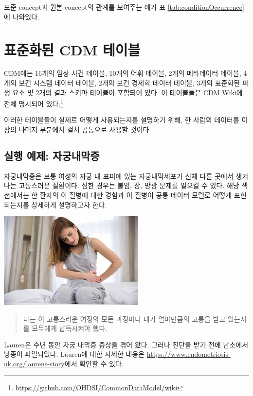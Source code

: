 \documentclass[11pt]{book}
\let\rmarkdownfootnote\footnote%
\def\footnote{\protect\rmarkdownfootnote}
\theoremstyle{definition}
\theoremstyle{definition}
\theoremstyle{definition}
\theoremstyle{remark}
\begin{document}
표준 concept과 원본 concept의 관계를 보여주는 예가 표
\ref{tab:conditionOccurrence}에 나와있다.

\section{표준화된 CDM 테이블}\label{-cdm-}


CDM에는 16개의 임상 사건 테이블, 10개의 어휘 테이블, 2개의 메타데이터
테이블, 4개의 보건 시스템 데이터 테이블, 2개의 보건 경제학 데이터
테이블, 3개의 표준화된 파생 요소 및 2개의 결과 스키마 테이블이 포함되어
있다. 이 테이블들은 CDM Wiki에 전체 명시되어 있다.\footnote{\url{https://github.com/OHDSI/CommonDataModel/wiki}}

이러한 테이블들이 실제로 어떻게 사용되는지를 설명하기 위해, 한 사람의
데이터를 이 장의 나머지 부분에서 걸쳐 공통으로 사용할 것이다.

\subsection{실행 예제: 자궁내막증}\label{--}

자궁내막증은 보통 여성의 자궁 내 표피에 있는 자궁내막세포가 신체 다른
곳에서 생겨나는 고통스러운 질환이다. 심한 경우는 불임, 장, 방광 문제를
일으킬 수 있다. 해당 섹션에서는 한 환자의 이 질병에 대한 경험과 이
질병이 공통 데이터 모델로 어떻게 표현되는지를 상세하게 설명하고자 한다.

\begin{center}\includegraphics[width=0.5\linewidth]{images/CommonDataModel/Lauren} \end{center}

\begin{quote}
나는 이 고통스러운 여정의 모든 과정마다 내가 얼마만큼의 고통을 받고
있는지를 모두에게 납득시켜야 했다.
\end{quote}

Lauren은 수년 동안 자궁 내막증 증상을 겪어 왔다. 그러나 진단을 받기 전에
난소에서 낭종이 파열되었다. Lauren에 대한 자세한 내용은
\url{https://www.endometriosis-uk.org/laurens-story}에서 확인할 수 있다.
\end{document}
